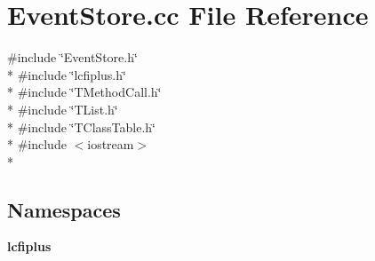 \section{Event\-Store.\-cc File Reference}
\label{EventStore_8cc}
{\ttfamily \#include \char`\"{}Event\-Store.\-h\char`\"{}}\\*
{\ttfamily \#include \char`\"{}lcfiplus.\-h\char`\"{}}\\*
{\ttfamily \#include \char`\"{}T\-Method\-Call.\-h\char`\"{}}\\*
{\ttfamily \#include \char`\"{}T\-List.\-h\char`\"{}}\\*
{\ttfamily \#include \char`\"{}T\-Class\-Table.\-h\char`\"{}}\\*
{\ttfamily \#include $<$iostream$>$}\\*
\subsection*{Namespaces}
\begin{DoxyCompactItemize}
\item 
{\bf lcfiplus}
\end{DoxyCompactItemize}
